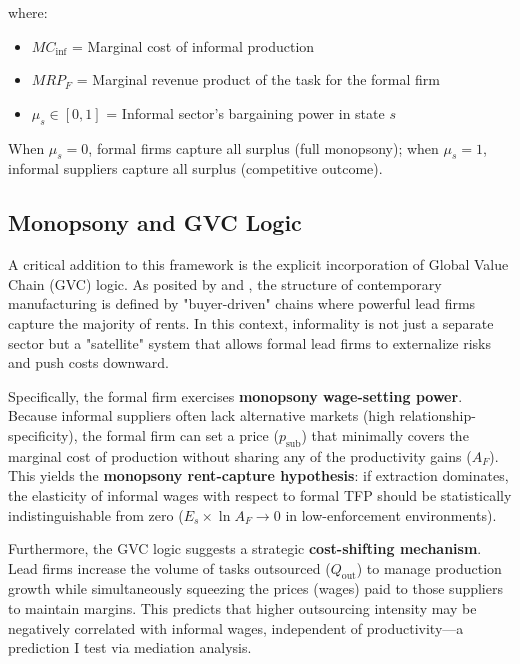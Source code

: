 where:
\begin{itemize}
	\item $MC_{\text{inf}}$ = Marginal cost of informal production
	\item $MRP_F$ = Marginal revenue product of the task for the formal firm
	\item $\mu_s \in [0,1]$ = Informal sector's bargaining power in state $s$
\end{itemize}

When $\mu_s = 0$, formal firms capture all surplus (full monopsony); when $\mu_s = 1$, informal suppliers capture all surplus (competitive outcome).

\subsection{Monopsony and GVC Logic}

A critical addition to this framework is the explicit incorporation of Global Value Chain (GVC) logic. As posited by \textcite{nadvi2004global} and \textcite{chen2007rethinking}, the structure of contemporary manufacturing is defined by "buyer-driven" chains where powerful lead firms capture the majority of rents. In this context, informality is not just a separate sector but a "satellite" system that allows formal lead firms to externalize risks and push costs downward.

Specifically, the formal firm exercises \textbf{monopsony wage-setting power}. Because informal suppliers often lack alternative markets (high relationship-specificity), the formal firm can set a price ($p_{\text{sub}}$) that minimally covers the marginal cost of production without sharing any of the productivity gains ($A_F$). This yields the \textbf{monopsony rent-capture hypothesis}: if extraction dominates, the elasticity of informal wages with respect to formal TFP should be statistically indistinguishable from zero ($E_s \times \ln A_F \to 0$ in low-enforcement environments).

Furthermore, the GVC logic suggests a strategic \textbf{cost-shifting mechanism}. Lead firms increase the volume of tasks outsourced ($Q_{\text{out}}$) to manage production growth while simultaneously squeezing the prices (wages) paid to those suppliers to maintain margins. This predicts that higher outsourcing intensity may be negatively correlated with informal wages, independent of productivity—a prediction I test via mediation analysis.

